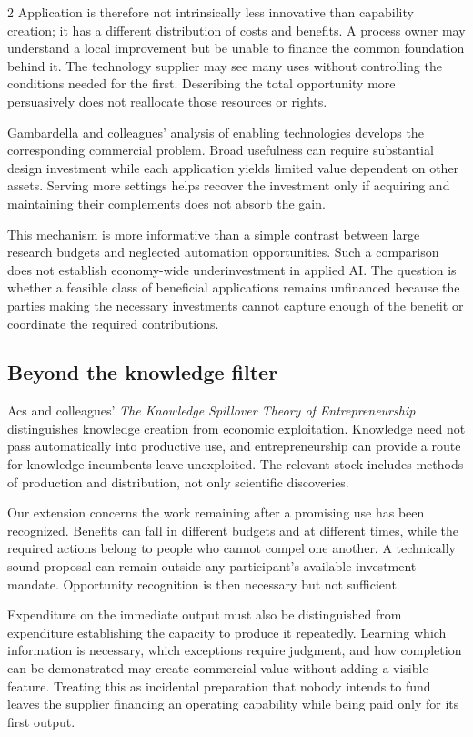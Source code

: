 \begin{multicols}{2}
Application is therefore not intrinsically less innovative than
capability creation; it has a different distribution of costs and
benefits. A process owner may understand a local improvement but be
unable to finance the common foundation behind it. The technology
supplier may see many uses without controlling the conditions needed for
the first. Describing the total opportunity more persuasively does not
reallocate those resources or rights.

Gambardella and colleagues' analysis of enabling technologies
\citep{gambardella2021enabling} develops the corresponding commercial
problem. Broad usefulness can require substantial design investment
while each application yields limited value dependent on other assets.
Serving more settings helps recover the investment only if acquiring and
maintaining their complements does not absorb the gain.

This mechanism is more informative than a simple contrast between large
research budgets and neglected automation opportunities. Such a
comparison does not establish economy-wide underinvestment in applied
AI. The question is whether a feasible class of beneficial applications
remains unfinanced because the parties making the necessary investments
cannot capture enough of the benefit or coordinate the required
contributions.

\subsection{Beyond the knowledge
filter}\label{beyond-the-knowledge-filter}

Acs and colleagues' \emph{The Knowledge Spillover Theory of
Entrepreneurship} \citep{acs2009spillover} distinguishes knowledge
creation from economic exploitation. Knowledge need not pass
automatically into productive use, and entrepreneurship can provide a
route for knowledge incumbents leave unexploited. The relevant stock
includes methods of production and distribution, not only scientific
discoveries.

Our extension concerns the work remaining after a promising use has been
recognized. Benefits can fall in different budgets and at different
times, while the required actions belong to people who cannot compel one
another. A technically sound proposal can remain outside any
participant's available investment mandate. Opportunity recognition is
then necessary but not sufficient.

Expenditure on the immediate output must also be distinguished from
expenditure establishing the capacity to produce it repeatedly. Learning
which information is necessary, which exceptions require judgment, and
how completion can be demonstrated may create commercial value without
adding a visible feature. Treating this as incidental preparation that
nobody intends to fund leaves the supplier financing an operating
capability while being paid only for its first output.


\end{multicols}
